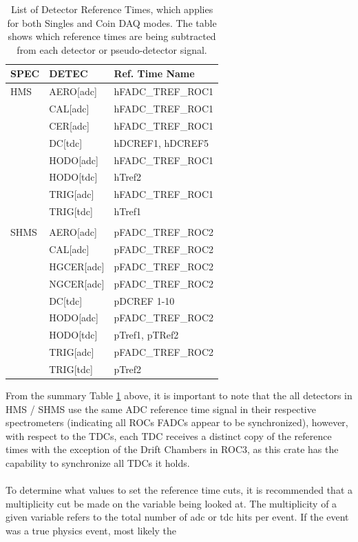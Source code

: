 \documentclass[14pt]{article}
\begin{document}
\begin{table}[h!]
\begin{tabular}{l l l}
SPEC  & DETEC & Ref. Time Name  \\
\hline
HMS & AERO[adc] & hFADC\_TREF\_ROC1 \\
& CAL[adc] & hFADC\_TREF\_ROC1 \\
& CER[adc] & hFADC\_TREF\_ROC1 \\
& DC[tdc] & hDCREF1, hDCREF5 \\
& HODO[adc] & hFADC\_TREF\_ROC1 \\
& HODO[tdc] & hTref2 \\
& TRIG[adc] &  hFADC\_TREF\_ROC1 \\
& TRIG[tdc] & hTref1 \\
\\
SHMS & AERO[adc] & pFADC\_TREF\_ROC2 \\
& CAL[adc] & pFADC\_TREF\_ROC2 \\
& HGCER[adc] & pFADC\_TREF\_ROC2 \\
& NGCER[adc] & pFADC\_TREF\_ROC2 \\
& DC[tdc] & pDCREF 1-10 \\
& HODO[adc] & pFADC\_TREF\_ROC2 \\
& HODO[tdc] & pTref1, pTRef2 \\
& TRIG[adc] & pFADC\_TREF\_ROC2 \\
& TRIG[tdc] & pTref2 \\
\end{tabular}
\caption{List of Detector Reference Times, which applies for both Singles and Coin DAQ modes. The table shows which reference times are being subtracted from each
detector or pseudo-detector signal.}
\label{tab:Table 3}
\end{table}
\noindent From the summary Table \ref{tab:Table 3} above, it is important to note that the all detectors in HMS / SHMS use the same ADC reference time signal in their respective spectrometers (indicating all ROCs FADCs appear to be synchronized),
however, with respect to the TDCs, each TDC receives a distinct copy of the reference times with the exception of the Drift Chambers in ROC3, as this crate has the capability to synchronize all TDCs it holds. \\
\\
\noindent To determine what values to set the reference time cuts, it is recommended that a multiplicity cut be made on the variable being looked at. The
multiplicity of a given variable refers to the total number of adc or tdc hits per event. If the event was a true physics event, most likely the
\end{document}
